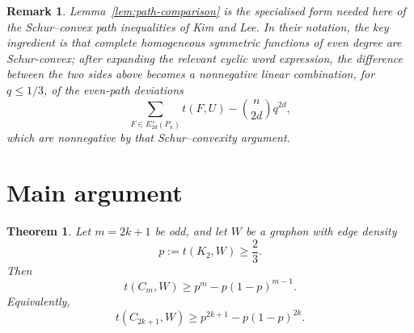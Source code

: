 \documentclass[11pt]{article}
\newtheorem{theorem}{Theorem}
\newtheorem{remark}{Remark}
\begin{document}
\begin{remark}
Lemma~\ref{lem:path-comparison} is the specialised form needed here of
the Schur--convex path inequalities of Kim and Lee.  In their notation,
the key ingredient is that complete homogeneous symmetric functions of
even degree are Schur-convex; after expanding the relevant cyclic word
expression, the difference between the two sides above becomes a
nonnegative linear combination, for $q\le 1/3$, of the even-path deviations
\[
    \sum_{F\in E^+_{2d}(P_n)}t(F,U)-\binom{n}{2d}q^{2d},
\]
which are nonnegative by that Schur--convexity argument.
\end{remark}

\section{Main argument}

\begin{theorem}
Let $m=2k+1$ be odd, and let $W$ be a graphon with edge density
\[
    p:=t(K_2,W)\ge \frac23.
\]
Then
\[
    t(C_m,W)
    \ge
    p^m-p(1-p)^{m-1}.
\]
Equivalently,
\[
    t(C_{2k+1},W)
    \ge
    p^{2k+1}-p(1-p)^{2k}.
\]
\end{theorem}
\end{document}
